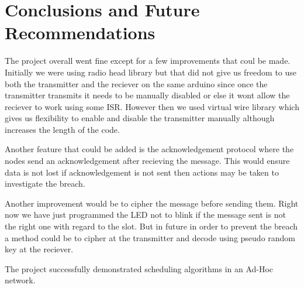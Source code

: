 \documentclass[12pt]{article}
\begin{document}
\section{Conclusions and Future Recommendations}

The project overall went fine except for a few improvements that coul be made. Initially we were using radio head library but that did not give us freedom to use both the transmitter and the reciever on the same arduino since once the transmitter transmits it needs to be manually disabled or else it wont allow the reciever to work using some ISR. However then we used virtual wire library which gives us flexibility to enable and disable the transmitter manually although increases the length of the code. 

Another feature that could be added is the acknowledgement protocol where the nodes send an acknowledgement after recieving the message. This would ensure data is not lost if acknowledgement is not sent then actions may be taken to investigate the breach. 

Another improvement would be to cipher the message before sending them. Right now we have just programmed the LED not to blink if the message sent is not the right one with regard to the slot. But in future in order to prevent the breach a method could be to cipher at the transmitter and decode using pseudo random key at the reciever. 

The project successfully demonstrated scheduling algorithms in an Ad-Hoc network. 

 
\end{document}
